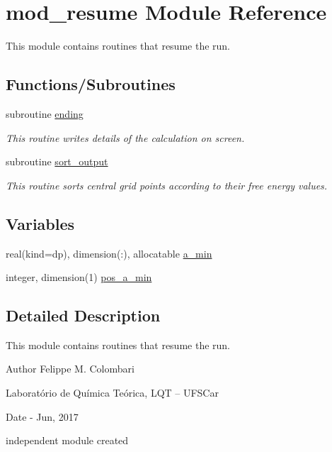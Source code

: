 \hypertarget{namespacemod__resume}{}\section{mod\+\_\+resume Module Reference}
\label{namespacemod__resume}


This module contains routines that resume the run.  


\subsection*{Functions/\+Subroutines}
\begin{DoxyCompactItemize}
\item 
subroutine \hyperlink{namespacemod__resume_a8b68b1d2c65fcac89fc9f40e0a028dd0}{ending}
\begin{DoxyCompactList}\small\item\em This routine writes details of the calculation on screen. \end{DoxyCompactList}\item 
subroutine \hyperlink{namespacemod__resume_a36133bfde88e19b38e5d5245c89843fe}{sort\+\_\+output}
\begin{DoxyCompactList}\small\item\em This routine sorts central grid points according to their free energy values. \end{DoxyCompactList}\end{DoxyCompactItemize}
\subsection*{Variables}
\begin{DoxyCompactItemize}
\item 
real(kind=dp), dimension(\+:), allocatable \hyperlink{namespacemod__resume_ad3cf0f0162ccc00d0efebb0348fe6ae5}{a\+\_\+min}
\item 
integer, dimension(1) \hyperlink{namespacemod__resume_a2861e2f353be05850b4ad384446859c6}{pos\+\_\+a\+\_\+min}
\end{DoxyCompactItemize}


\subsection{Detailed Description}
This module contains routines that resume the run. 

\begin{DoxyAuthor}{Author}
Felippe M. Colombari
\begin{DoxyItemize}
\item Laboratório de Química Teórica, L\+QT -- U\+F\+S\+Car 
\end{DoxyItemize}
\end{DoxyAuthor}
\begin{DoxyDate}{Date}
-\/ Jun, 2017
\begin{DoxyItemize}
\item independent module created 
\end{DoxyItemize}
\end{DoxyDate}


